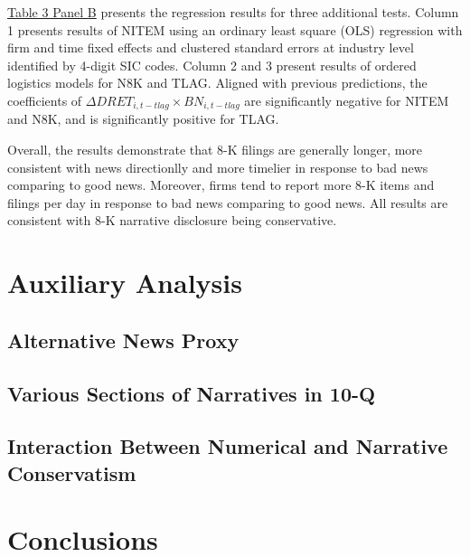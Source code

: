 \documentclass[a4paper]{article}
\begin{document}
\begin{spacing}{2}
\hyperref[T3PB]{Table 3 Panel B} presents the regression results for three additional tests. Column 1 presents results of NITEM using an ordinary least square (OLS) regression with firm and time fixed effects and clustered standard errors at industry level identified by 4-digit SIC codes. Column 2 and 3 present results of ordered logistics models for N8K and TLAG. %
Aligned with previous predictions, the coefficients of $\Delta DRET_{i,t-tlag}\times BN_{i,t-tlag}$ are significantly negative for NITEM and N8K, and is significantly positive for TLAG.

Overall, the results demonstrate that 8-K filings are generally longer, more consistent with news directionlly and more timelier in response to bad news comparing to good news. Moreover, firms tend to report more 8-K items and filings per day in response to bad news comparing to good news. All results are consistent with 8-K narrative disclosure being conservative.
\section{Auxiliary Analysis}

\subsection{Alternative News Proxy}

\subsection{Various Sections of Narratives in 10-Q}

\subsection{Interaction Between Numerical and Narrative Conservatism}

\section{Conclusions}

\end{spacing}

\newpage



\newpage


\newpage


\newpage


\newpage
\setcounter{page}{1}

\end{document}
